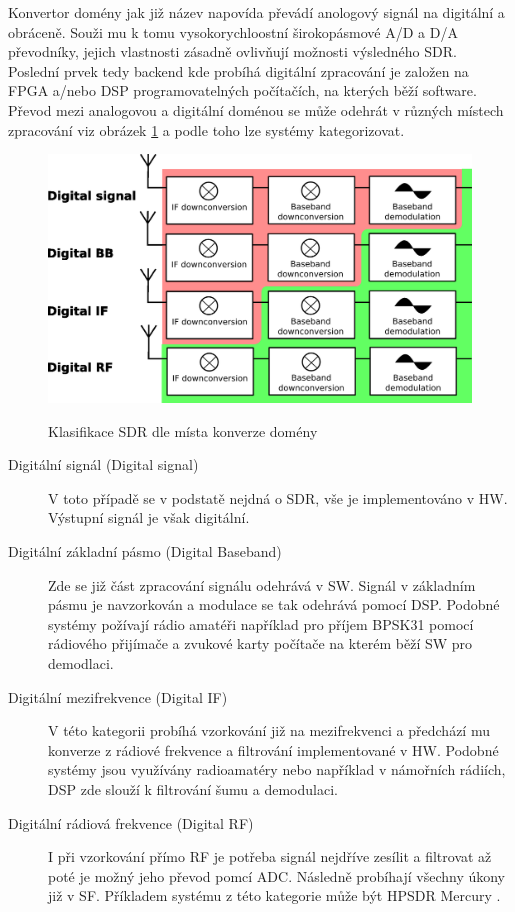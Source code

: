 \documentclass{ctuthesis}
\begin{document}
Konvertor domény jak již název napovída převádí anologový signál na digitální a obráceně. Souži mu k tomu vysokorychloostní širokopásmové A/D a D/A převodníky, jejich vlastnosti zásadně ovlivňují možnosti výsledného SDR. \\
 Poslední prvek tedy backend kde probíhá digitální zpracování je založen na FPGA a/nebo DSP programovatelných počítačích, na kterých běží software.\\
Převod mezi analogovou a digitální  doménou se může odehrát v různých místech zpracování viz obrázek  \ref{SDRconversion} a podle toho lze systémy kategorizovat.
\begin{figure}
\caption{Klasifikace SDR dle místa konverze domény\cite{andrásretzler2014}}
\includegraphics[width=1\textwidth]{./images/SDRconversion.png}
\label{SDRconversion}
\end{figure}
\begin{description}
\item[Digitální signál (Digital signal)]
V toto případě se v podstatě nejdná o SDR, vše je implementováno v HW. Výstupní signál je však digitální.
\item[Digitální základní pásmo (Digital Baseband)]
Zde se již část zpracování signálu odehrává v SW. Signál v základním pásmu je navzorkován a modulace se tak odehrává pomocí DSP. Podobné systémy požívají rádio amatéři například pro příjem BPSK31 pomocí rádiového přijímače a zvukové karty počítače na kterém běží SW pro demodlaci.
\item[Digitální mezifrekvence (Digital IF)]
V této kategorii probíhá vzorkování již na mezifrekvenci a předchází mu konverze z rádiové frekvence a filtrování implementované v HW. Podobné systémy jsou využívány radioamatéry nebo například v námořních rádiích, DSP zde slouží k filtrování šumu a demodulaci. 
\item[Digitální rádiová frekvence (Digital RF)]
I při vzorkování přímo RF je potřeba signál nejdříve zesílit a filtrovat až poté je možný jeho převod pomcí ADC. Následně probíhají všechny úkony již v SF. Příkladem systému z této kategorie může být HPSDR Mercury \cite{tapr} .
\end{description}
\end{document}

